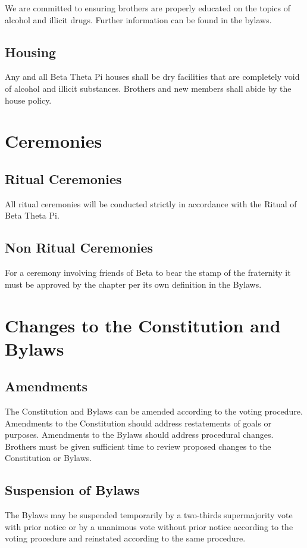 We are committed to ensuring brothers are properly educated on the topics of
alcohol and illicit drugs.
Further information can be found in the bylaws.

\section{Housing}
\label{sec:housing}

Any and all Beta Theta Pi houses shall be dry facilities that are completely
void of alcohol and illicit substances.
Brothers and new members shall abide by the house policy.

\chapter{Ceremonies}
\label{cha:ceremonies}

\section{Ritual Ceremonies}
\label{sec:ritual-ceremonies}

All ritual ceremonies will be conducted strictly in accordance with the Ritual
of Beta Theta Pi.

\section{Non Ritual Ceremonies}
\label{sec:non-ritual-ceremonies}

For a ceremony involving friends of Beta to bear the stamp of the fraternity it
must be approved by the chapter per its own definition in the Bylaws.

\chapter{Changes to the Constitution and Bylaws}
\label{cha:changes-to-the-constitution-and-bylaws}

\section{Amendments}
\label{sec:amendments}

The Constitution and Bylaws can be amended according to the voting procedure.
Amendments to the Constitution should address restatements of goals or purposes.
Amendments to the Bylaws should address procedural changes.
Brothers must be given sufficient time to review proposed changes to the
Constitution or Bylaws.

\section{Suspension of Bylaws}
\label{sec:suspension-of-bylaws}

The Bylaws may be suspended temporarily by a two-thirds supermajority vote with
prior notice or by a unanimous vote without prior notice according to the voting
procedure and reinstated according to the same procedure.

